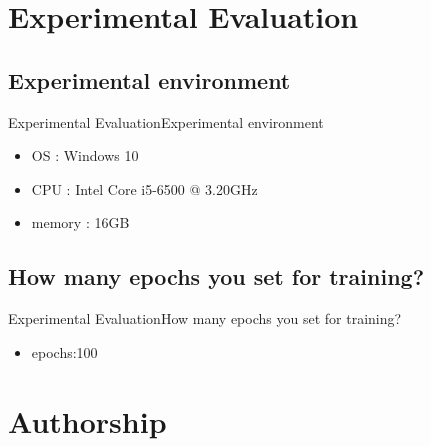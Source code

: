 \documentclass{beamer}
\begin{document}
\begin{CJK*}{UTF8}{bsmi}
\section{Experimental Evaluation}
\subsection*{Experimental environment}
\begin{frame}{Experimental Evaluation}{Experimental environment}
  \begin{itemize}
  \item {
   OS : Windows 10
  }
  \item {
   CPU : Intel Core i5-6500 @ 3.20GHz
  }
  \item {
   memory : 16GB
  }
  \end{itemize}
\end{frame}
\subsection*{How many epochs you set for training?}
\begin{frame}{Experimental Evaluation}{How many epochs you set for training?}
  \begin{itemize}
  \item {
  epochs:100
  }
  \end{itemize}
\end{frame}

\section{Authorship}

\end{CJK*}
\end{document}
